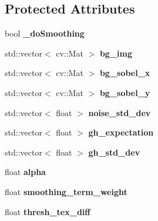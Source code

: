 \subsection*{Protected Attributes}
\begin{DoxyCompactItemize}
\item 
\hypertarget{classskl_1_1_tex_cut_a009d4291f63514a949562a0ce0059a4a}{}\label{classskl_1_1_tex_cut_a009d4291f63514a949562a0ce0059a4a} 
bool {\bfseries \+\_\+do\+Smoothing}
\item 
\hypertarget{classskl_1_1_tex_cut_a3b56d571fda6b2aefa50f2d96b7bd4f3}{}\label{classskl_1_1_tex_cut_a3b56d571fda6b2aefa50f2d96b7bd4f3} 
std\+::vector$<$ cv\+::\+Mat $>$ {\bfseries bg\+\_\+img}
\item 
\hypertarget{classskl_1_1_tex_cut_a9f627c2647c654a98e308b29c8dc7976}{}\label{classskl_1_1_tex_cut_a9f627c2647c654a98e308b29c8dc7976} 
std\+::vector$<$ cv\+::\+Mat $>$ {\bfseries bg\+\_\+sobel\+\_\+x}
\item 
\hypertarget{classskl_1_1_tex_cut_a11d036175b39e40f324d9fdeaf92ab09}{}\label{classskl_1_1_tex_cut_a11d036175b39e40f324d9fdeaf92ab09} 
std\+::vector$<$ cv\+::\+Mat $>$ {\bfseries bg\+\_\+sobel\+\_\+y}
\item 
\hypertarget{classskl_1_1_tex_cut_ae6a696dbb5e396c06924c576d8f00916}{}\label{classskl_1_1_tex_cut_ae6a696dbb5e396c06924c576d8f00916} 
std\+::vector$<$ float $>$ {\bfseries noise\+\_\+std\+\_\+dev}
\item 
\hypertarget{classskl_1_1_tex_cut_a65520dd2b2cc7e6fdcee2df2b0b88544}{}\label{classskl_1_1_tex_cut_a65520dd2b2cc7e6fdcee2df2b0b88544} 
std\+::vector$<$ float $>$ {\bfseries gh\+\_\+expectation}
\item 
\hypertarget{classskl_1_1_tex_cut_a02e4bf3d27947c2b4fa4943deb6c4bdc}{}\label{classskl_1_1_tex_cut_a02e4bf3d27947c2b4fa4943deb6c4bdc} 
std\+::vector$<$ float $>$ {\bfseries gh\+\_\+std\+\_\+dev}
\item 
\hypertarget{classskl_1_1_tex_cut_a3c839d9fbfc31b39ed8746cbd843382c}{}\label{classskl_1_1_tex_cut_a3c839d9fbfc31b39ed8746cbd843382c} 
float {\bfseries alpha}
\item 
\hypertarget{classskl_1_1_tex_cut_ae560cca1682e51ce2a3b710ffc36393d}{}\label{classskl_1_1_tex_cut_ae560cca1682e51ce2a3b710ffc36393d} 
float {\bfseries smoothing\+\_\+term\+\_\+weight}
\item 
\hypertarget{classskl_1_1_tex_cut_a330f506ac8c577542a342882b17ea130}{}\label{classskl_1_1_tex_cut_a330f506ac8c577542a342882b17ea130} 
float {\bfseries thresh\+\_\+tex\+\_\+diff}
\item 

\end{DoxyCompactItemize}
